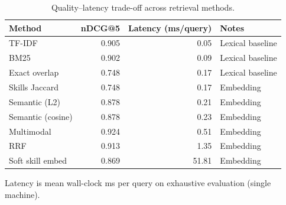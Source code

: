 \begin{table}[htbp]
\centering
\caption{Quality–latency trade-off across retrieval methods.}
\label{tab:latency}
\begin{tabular}{lrrl}
\toprule
Method & nDCG@5 & Latency (ms/query) & Notes \\
\midrule
TF-IDF & 0.905 & 0.05 & Lexical baseline \\
BM25 & 0.902 & 0.09 & Lexical baseline \\
Exact overlap & 0.748 & 0.17 & Lexical baseline \\
Skills Jaccard & 0.748 & 0.17 & Embedding \\
Semantic (L2) & 0.878 & 0.21 & Embedding \\
Semantic (cosine) & 0.878 & 0.23 & Embedding \\
Multimodal & 0.924 & 0.51 & Embedding \\
RRF & 0.913 & 1.35 & Embedding \\
Soft skill embed & 0.869 & 51.81 & Embedding \\
\bottomrule
\end{tabular}
\footnotesize{Latency is mean wall-clock ms per query on exhaustive evaluation (single machine).}
\end{table}

